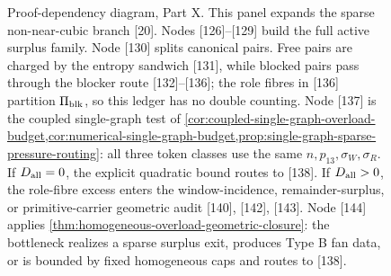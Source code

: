 \documentclass[11pt]{article}
\begin{document}
\begin{figure}[p]
{%
}
\caption[Proof-dependency diagram, Part X]{Proof-dependency diagram, Part X.  This panel expands the sparse non-near-cubic branch [20].  Nodes [126]--[129] build the full active surplus family.  Node [130] splits canonical pairs.  Free pairs are charged by the entropy sandwich [131], while blocked pairs pass through the blocker route [132]--[136]; the role fibres in [136] partition \(\Pi_{\rm blk}\), so this ledger has no double counting.  Node [137] is the coupled single-graph test of \cref{cor:coupled-single-graph-overload-budget,cor:numerical-single-graph-budget,prop:single-graph-sparse-pressure-routing}: all three token classes use the same \(n,p_{13},\sigma_W,\sigma_R\).  If \(D_{\rm all}=0\), the explicit quadratic bound routes to [138].  If \(D_{\rm all}>0\), the role-fibre excess enters the window-incidence, remainder-surplus, or primitive-carrier geometric audit [140], [142], [143].  Node [144] applies \cref{thm:homogeneous-overload-geometric-closure}: the bottleneck realizes a sparse surplus exit, produces Type B fan data, or is bounded by fixed homogeneous caps and routes to [138].}
\label{fig:proof-diagram-part-x}
\end{figure}

\clearpage
\end{document}
